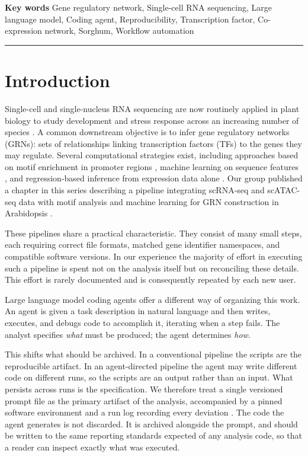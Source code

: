 \vspace{0.6em}
\textbf{Key words} Gene regulatory network, Single-cell RNA sequencing, Large language model, Coding agent, Reproducibility, Transcription factor, Co-expression network, Sorghum, Workflow automation

\vspace{0.8em}
\hrule

\section{Introduction}

Single-cell and single-nucleus RNA sequencing are now routinely applied in plant biology to study development and stress response across an increasing number of species \cite{ryu2019,denyer2019,dorrity2021,shahan2022,marand2021}. A common downstream objective is to infer gene regulatory networks (GRNs): sets of relationships linking transcription factors (TFs) to the genes they may regulate. Several computational strategies exist, including approaches based on motif enrichment in promoter regions \cite{kulkarni2018,grant2011}, machine learning on sequence features \cite{song2020}, and regression-based inference from expression data alone \cite{moerman2019,vandesande2020,aibar2017}. Our group published a chapter in this series describing a pipeline integrating scRNA-seq and scATAC-seq data with motif analysis and machine learning for GRN construction in Arabidopsis \cite{chau2023}.

These pipelines share a practical characteristic. They consist of many small steps, each requiring correct file formats, matched gene identifier namespaces, and compatible software versions. In our experience the majority of effort in executing such a pipeline is spent not on the analysis itself but on reconciling these details. This effort is rarely documented and is consequently repeated by each new user.

Large language model coding agents offer a different way of organizing this work. An agent is given a task description in natural language and then writes, executes, and debugs code to accomplish it, iterating when a step fails. The analyst specifies \textit{what} must be produced; the agent determines \textit{how}.

This shifts what should be archived. In a conventional pipeline the scripts are the reproducible artifact. In an agent-directed pipeline the agent may write different code on different runs, so the scripts are an output rather than an input. What persists across runs is the specification. We therefore treat a single versioned prompt file as the primary artifact of the analysis, accompanied by a pinned software environment and a run log recording every deviation . The code the agent generates is not discarded. It is archived alongside the prompt, and should be written to the same reporting standards expected of any analysis code, so that a reader can inspect exactly what was executed.

